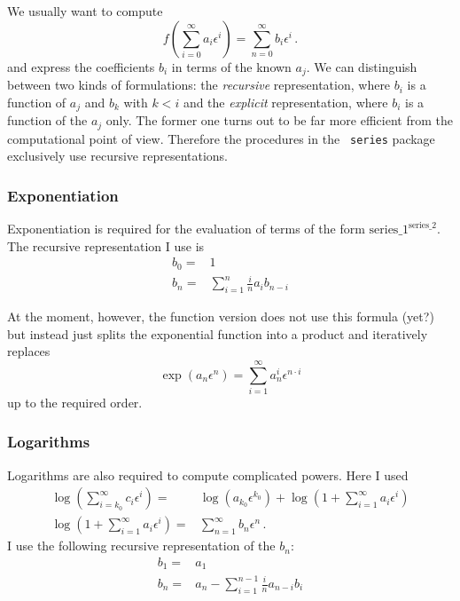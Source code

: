 \documentclass{article}
\begin{document}
 We usually want to compute
\begin{equation}
  \label{eq:def}
  f\left(\sum_{i=0}^{\infty}a_i \epsilon^i\right)=\sum_{n=0}^\infty b_i \epsilon^i\,.
\end{equation}
and express the coefficients $b_i$ in terms of the known $a_j$. We can
distinguish between two kinds of formulations: the {\it recursive} representation,
where $b_i$ is a function of $a_j$ and $b_k$ with $k < i$ and the {\it
  explicit} representation, where $b_i$ is a function of the $a_j$ only.
The former one turns out to be far more efficient from the
computational point of view. Therefore the procedures in the {\tt
  series} package exclusively use recursive representations.

\subsubsection{Exponentiation}
\label{sec:impl_exp}

Exponentiation is required for the evaluation of terms of the form
$\text{series\_1}^{\text{series\_2}}$.
The recursive representation I use is
\begin{align}
  \label{eq:exp_rec}
b_0=&1\\
b_n =&  \sum_{i=1}^{n} \frac{i}{n} a_{i}b_{n-i}
\end{align}

 At the moment, however, the function version does not use this formula (yet?) but instead just splits the
 exponential function into a product and iteratively replaces
 \begin{equation}
   \label{eq:exp_simple}
   \exp(a_n \epsilon^n)=\sum_{i=1}^\infty a_n^i \epsilon^{n\cdot i}
 \end{equation}
up to the required order.


\subsubsection{Logarithms}
\label{sec:impl_log}

Logarithms are also required to compute complicated powers. Here I used
\begin{align}
  \label{eq:log}
\log\left(\sum_{i=k_0}^{\infty}c_i \epsilon^i\right)=&\log\left(a_{k_0}\epsilon^{k_0}\right)+\log\left(1+\sum_{i=1}^{\infty}a_i \epsilon^i\right)\\
\log\left(1+\sum_{i=1}^{\infty}a_i \epsilon^i\right)=&\sum_{n=1}^\infty
b_n\epsilon^n\,.
\end{align}
I use the following recursive representation of the $b_n$:
\begin{align}
  \label{eq:log_rec}
b_1=&a_1\\
b_n =& a_n - \sum_{i=1}^{n-1} \frac{i}{n} a_{n-i}b_{i}
\end{align}
\end{document}
